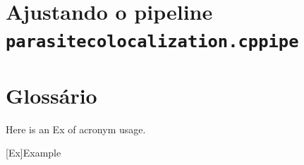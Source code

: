 \documentclass{article}
\begin{document}
\section{Ajustando o pipeline \texttt{parasitecolocalization.cppipe}}

\section{Glossário}

Here is an \ac{Ex} of acronym usage.

\begin{acronym} \itemsep=-8pt
  [Ex]{Example}
\end{acronym}

\printbibliography





\end{document}
